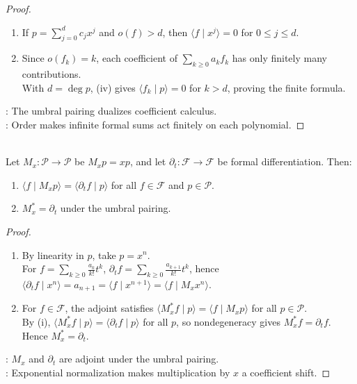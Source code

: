 \begin{proposition}
\begin{proof}
\begin{enumerate}[label=(\roman*)]
\item If $p=\sum\limits_{j=0}^{d}c_jx^j$ and $o(f)>d$, then $\langle f\mid x^j\rangle=0$ for $0\leq j\leq d$.
\item Since $o(f_k)=k$, each coefficient of $\sum\limits_{k\geq0}a_kf_k$ has only finitely many contributions.\\
With $d=\deg p$, (iv) gives $\langle f_k\mid p\rangle=0$ for $k>d$, proving the finite formula.
\end{enumerate}
: The umbral pairing dualizes coefficient calculus.\\
: Order makes infinite formal sums act finitely on each polynomial.
\end{proof}
\end{proposition}

\begin{theorem} \label{thm:umbral-multiplication-by-x-is-formal-derivative} \\
Let $M_x:\mathscr{P}\to\mathscr{P}$ be $M_xp=xp$, and let $\partial_t:\mathscr{F}\to\mathscr{F}$ be formal differentiation. Then:
\begin{enumerate}[label=(\roman*)]
\setlength{\itemsep}{0pt}
\item $\langle f\mid M_xp\rangle=\langle\partial_t f\mid p\rangle$ for all $f\in\mathscr{F}$ and $p\in\mathscr{P}$.
\item $M_x^\ast=\partial_t$ under the umbral pairing.
\end{enumerate}
\begin{proof}
\begin{enumerate}[label=(\roman*)]
\setlength{\itemsep}{0pt}
\item By linearity in $p$, take $p=x^n$.\\
For $f=\sum\limits_{k\geq0}\frac{a_k}{k!}t^k$, $\partial_t f=\sum\limits_{k\geq0}\frac{a_{k+1}}{k!}t^k$, hence $\langle\partial_t f\mid x^n\rangle=a_{n+1}=\langle f\mid x^{n+1}\rangle=\langle f\mid M_xx^n\rangle$.
\item For $f\in\mathscr{F}$, the adjoint satisfies $\langle M_x^\ast f\mid p\rangle=\langle f\mid M_xp\rangle$ for all $p\in\mathscr{P}$.\\
By (i), $\langle M_x^\ast f\mid p\rangle=\langle\partial_t f\mid p\rangle$ for all $p$, so nondegeneracy gives $M_x^\ast f=\partial_t f$. Hence $M_x^\ast=\partial_t$.
\end{enumerate}
: $M_x$ and $\partial_t$ are adjoint under the umbral pairing.\\
: Exponential normalization makes multiplication by $x$ a coefficient shift.
\end{proof}
\end{theorem}


